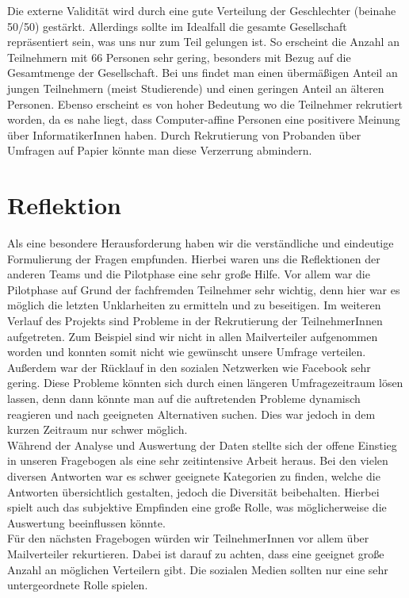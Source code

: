 \documentclass[de]{agse-empir-report}\usepackage[]{graphicx}\usepackage[]{color}
\begin{document}
Die externe Validität wird durch eine gute Verteilung der Geschlechter (beinahe 50/50) gestärkt. Allerdings sollte im Idealfall die gesamte Gesellschaft repräsentiert sein, was uns nur zum Teil gelungen ist. So erscheint die Anzahl an Teilnehmern mit 66 Personen sehr gering, besonders mit Bezug auf die Gesamtmenge der Gesellschaft. Bei uns findet man einen übermäßigen Anteil an jungen Teilnehmern (meist Studierende) und einen geringen Anteil an älteren Personen. Ebenso erscheint es von hoher Bedeutung wo die Teilnehmer rekrutiert worden, da es nahe liegt, dass Computer-affine Personen eine positivere Meinung über InformatikerInnen haben. Durch Rekrutierung von Probanden über Umfragen auf Papier könnte man diese Verzerrung abmindern.

\section[jk]{Reflektion}

Als eine besondere Herausforderung haben wir die verständliche und eindeutige Formulierung der Fragen empfunden. Hierbei waren uns die Reflektionen der anderen Teams und die Pilotphase eine sehr große Hilfe. Vor allem war die Pilotphase auf Grund der fachfremden Teilnehmer sehr wichtig, denn hier war es möglich die letzten Unklarheiten zu ermitteln und zu beseitigen. Im weiteren Verlauf des Projekts sind Probleme in der Rekrutierung der TeilnehmerInnen aufgetreten. Zum Beispiel sind wir nicht in allen Mailverteiler aufgenommen worden und konnten somit nicht wie gewünscht unsere Umfrage verteilen. Außerdem war der Rücklauf in den sozialen Netzwerken wie Facebook sehr gering. Diese Probleme könnten sich durch einen längeren Umfragezeitraum lösen lassen, denn dann könnte man auf die auftretenden Probleme dynamisch reagieren und nach geeigneten Alternativen suchen. Dies war jedoch in dem kurzen Zeitraum nur schwer möglich.\\
Während der Analyse und Auswertung der Daten stellte sich der offene Einstieg in unseren Fragebogen als eine sehr zeitintensive Arbeit heraus. Bei den vielen diversen Antworten war es schwer geeignete Kategorien zu finden, welche die Antworten übersichtlich gestalten, jedoch die Diversität beibehalten. Hierbei spielt auch das subjektive Empfinden eine große Rolle, was möglicherweise die Auswertung beeinflussen könnte.\\
Für den nächsten Fragebogen würden wir TeilnehmerInnen vor allem über Mailverteiler rekurtieren. Dabei ist darauf zu achten, dass eine geeignet große Anzahl an möglichen Verteilern gibt. Die sozialen Medien sollten nur eine sehr untergeordnete Rolle spielen.
\end{document}
